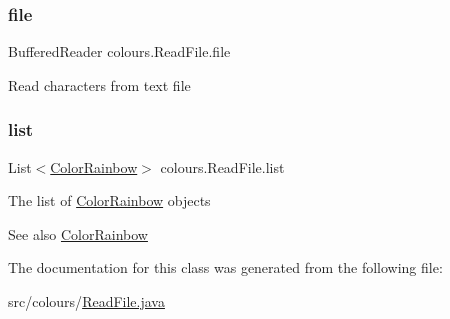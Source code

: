 \subsubsection{\texorpdfstring{file}{file}}
{\footnotesize\ttfamily Buffered\+Reader colours.\+Read\+File.\+file\hspace{0.3cm}{\ttfamily [private]}}

Read characters from text file \mbox{\label{classcolours_1_1_read_file_ada4823ab03166bb5b0c388b40460fa7d}} 
\subsubsection{\texorpdfstring{list}{list}}
{\footnotesize\ttfamily List$<$\hyperlink{classcolours_1_1_color_rainbow}{Color\+Rainbow}$>$ colours.\+Read\+File.\+list\hspace{0.3cm}{\ttfamily [private]}}

The list of \hyperlink{classcolours_1_1_color_rainbow}{Color\+Rainbow} objects \begin{DoxySeeAlso}{See also}
\hyperlink{classcolours_1_1_color_rainbow}{Color\+Rainbow} 
\end{DoxySeeAlso}


The documentation for this class was generated from the following file\+:\begin{DoxyCompactItemize}
\item 
src/colours/\hyperlink{_read_file_8java}{Read\+File.\+java}\end{DoxyCompactItemize}
